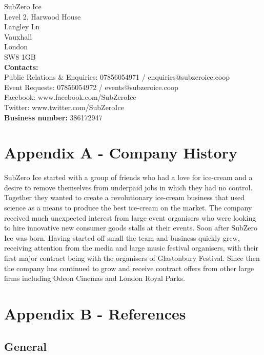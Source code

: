 \documentclass{article}
\begin{document}
SubZero Ice \\
Level 2, Harwood House \\
Langley Ln \\
Vauxhall \\
London \\
SW8 1GB \\ 

{\bf Contacts:} \\

Public Relations \& Enquiries: 07856054971 / enquiries@subzeroice.coop \\

Event Requests: 07856054972 / events@subzeroice.coop \\

Facebook: www.facebook.com/SubZeroIce \\

Twitter: www.twitter.com/SubZeroIce \\

{\bf Business number:} 386172947

\pagebreak

\section{Appendix A - Company History}

SubZero Ice started with a group of friends who had a love for ice-cream and a desire to remove themselves from underpaid jobs in which they had no control. Together they wanted to create a revolutionary ice-cream business that used science as a means to produce the best ice-cream on the market. The company received much unexpected interest from large event organisers who were looking to hire innovative new consumer goods stalls at their events. Soon after SubZero Ice was born. Having started off small the team and business quickly grew, receiving attention from the media and large music festival organisers, with their first major contract being with the organisers of Glastonbury Festival. Since then the company has continued to grow and receive contract offers from other large firms including Odeon Cinemas and London Royal Parks.

\section{Appendix B - References}

\subsection{General}
\end{document}
